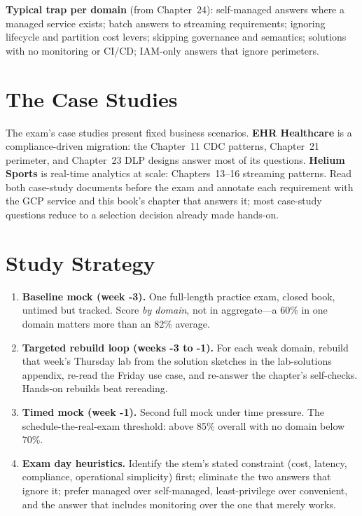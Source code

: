 \noindent\textbf{Typical trap per domain} (from Chapter~24): self-managed answers where a managed
service exists; batch answers to streaming requirements; ignoring lifecycle and partition cost
levers; skipping governance and semantics; solutions with no monitoring or CI/CD; IAM-only answers
that ignore perimeters.

\section{The Case Studies}
%
The exam's case studies present fixed business scenarios. \textbf{EHR Healthcare} is a
compliance-driven migration: the Chapter~11 CDC patterns, Chapter~21 perimeter, and Chapter~23 DLP
designs answer most of its questions. \textbf{Helium Sports} is real-time analytics at scale:
Chapters~13--16 streaming patterns. Read both case-study documents before the exam and annotate
each requirement with the GCP service and this book's chapter that answers it; most case-study
questions reduce to a selection decision already made hands-on.

\section{Study Strategy}
\begin{enumerate}
    \item \textbf{Baseline mock (week -3).} One full-length practice exam, closed book, untimed
    but tracked. Score \emph{by domain}, not in aggregate---a 60\% in one domain matters more
    than an 82\% average.
    \item \textbf{Targeted rebuild loop (weeks -3 to -1).} For each weak domain, rebuild that
    week's Thursday lab from the solution sketches in the lab-solutions appendix, re-read the
    Friday use case, and re-answer the chapter's self-checks. Hands-on rebuilds beat rereading.
    \item \textbf{Timed mock (week -1).} Second full mock under time pressure. The
    schedule-the-real-exam threshold: above 85\% overall with no domain below 70\%.
    \item \textbf{Exam day heuristics.} Identify the stem's stated constraint (cost, latency,
    compliance, operational simplicity) first; eliminate the two answers that ignore it; prefer
    managed over self-managed, least-privilege over convenient, and the answer that includes
    monitoring over the one that merely works.
\end{enumerate}

